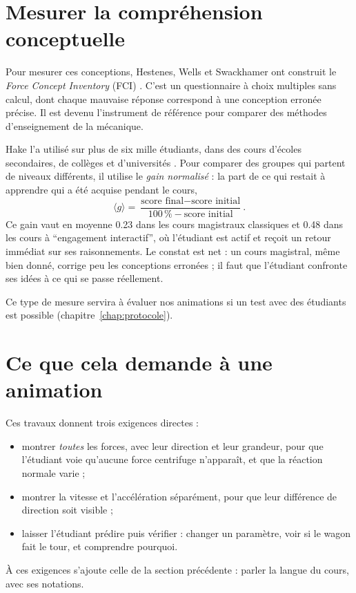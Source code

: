 \section{Mesurer la compréhension conceptuelle}

Pour mesurer ces conceptions, Hestenes, Wells et Swackhamer ont construit le
\emph{Force Concept Inventory} (FCI) \cite{hestenes1992fci}. C'est un
questionnaire à choix multiples sans calcul, dont chaque mauvaise réponse
correspond à une conception erronée précise. Il est devenu l'instrument de
référence pour comparer des méthodes d'enseignement de la mécanique.

Hake l'a utilisé sur plus de six mille étudiants, dans des cours d'écoles
secondaires, de collèges et d'universités \cite{hake1998}. Pour comparer des
groupes qui partent de niveaux différents, il utilise le \emph{gain
normalisé} : la part de ce qui restait à apprendre qui a été acquise pendant
le cours,
\[
  \langle g \rangle = \frac{\text{score final} - \text{score initial}}
                           {100\,\% - \text{score initial}} .
\]
Ce gain vaut en moyenne \num{0,23} dans les cours magistraux classiques et
\num{0,48} dans les cours à \enquote{engagement interactif}, où l'étudiant
est actif et reçoit un retour immédiat sur ses raisonnements. Le constat est
net : un cours magistral, même bien donné, corrige peu les conceptions
erronées ; il faut que l'étudiant confronte ses idées à ce qui se passe
réellement.

Ce type de mesure servira à évaluer nos animations si un test avec des
étudiants est possible (chapitre~\ref{chap:protocole}).

\section{Ce que cela demande à une animation}

Ces travaux donnent trois exigences directes :
\begin{itemize}
  \item montrer \emph{toutes} les forces, avec leur direction et leur
        grandeur, pour que l'étudiant voie qu'aucune force centrifuge
        n'apparaît, et que la réaction normale varie ;
  \item montrer la vitesse et l'accélération séparément, pour que leur
        différence de direction soit visible ;
  \item laisser l'étudiant prédire puis vérifier : changer un paramètre, voir
        si le wagon fait le tour, et comprendre pourquoi.
\end{itemize}
À ces exigences s'ajoute celle de la section précédente : parler la langue du
cours, avec ses notations.
